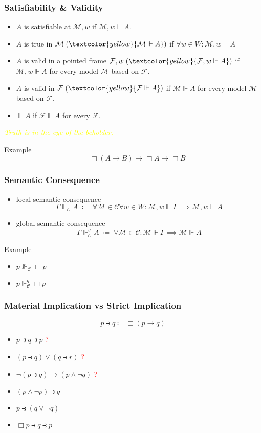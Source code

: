 \documentclass[UTF8,aspectratio=43,11pt,colorlinks,compress,openany]{beamer}%
\begin{document}
\begin{frame}\frametitle{Satisfiability \& Validity}
	\begin{itemize}
		\item $A$ is satisfiable at $\mathcal{M},w$ if $\mathcal{M},w\Vdash A$.
		\item $A$ is true in $\mathcal{M}\;(\textcolor{yellow}{\mathcal{M}\Vdash A})$ if $\forall w\in W: \mathcal{M},w\Vdash A$
		\item $A$ is valid in a pointed frame $\mathcal{F},w\;(\textcolor{yellow}{\mathcal{F},w\Vdash A})$ if $\mathcal{M},w\Vdash A$ for every model $\mathcal{M}$ based on $\mathcal{F}$.
		\item $A$ is valid in $\mathcal{F}\;(\textcolor{yellow}{\mathcal{F}\Vdash A})$ if $\mathcal{M}\Vdash A$ for every model $\mathcal{M}$ based on $\mathcal{F}$.
		\item $\Vdash A$ if $\mathcal{F}\Vdash A$ for every $\mathcal{F}$.
	\end{itemize}
\centering\textcolor{yellow}{\emph{Truth is in the eye of the beholder.}}
\setlength\abovedisplayskip{0pt}
	\begin{block}{Example}
		\[\Vdash\Box(A\to B)\to\Box A\to\Box B\]
	\end{block}
\end{frame}

\begin{frame}\frametitle{Semantic Consequence}
	\begin{itemize}
		\item local semantic consequence
		\[\Gamma\Vdash_{\mathcal{C}} A\;\coloneqq \;\forall \mathcal{M}\in\mathcal{C}\forall w\in W:\mathcal{M},w\Vdash\Gamma\implies\mathcal{M},w\Vdash A\]
		\item global semantic consequence
		\[\Gamma\Vdash_{\mathcal{C}}^g A\;\coloneqq \;\forall \mathcal{M}\in\mathcal{C}: \mathcal{M}\Vdash\Gamma\implies\mathcal{M}\Vdash A\]
	\end{itemize}
	\begin{block}{Example}
		\begin{itemize}
			\item $p\nVdash_{\mathcal{C}}\Box p$
			\item $p\Vdash_{\mathcal{C}}^g\Box p$
		\end{itemize}
	\end{block}
\end{frame}

\begin{frame}\frametitle{Material Implication vs Strict Implication}
\[p\strictif q \coloneqq  \Box(p\to q)\]
\begin{itemize}
	\item $p\strictif q\strictif p$ \textcolor{red}{?}
	\item $(p\strictif q)\vee(q\strictif r)$ \textcolor{red}{?}
	\item $\neg(p\strictif q)\to(p\wedge\neg q)$ \textcolor{red}{?}
	\item $(p\wedge\neg p)\strictif q$
	\item $p\strictif(q\vee\neg q)$
	\item $\Box p\strictif q\strictif p$
\end{itemize}
\end{frame}
\end{document}
